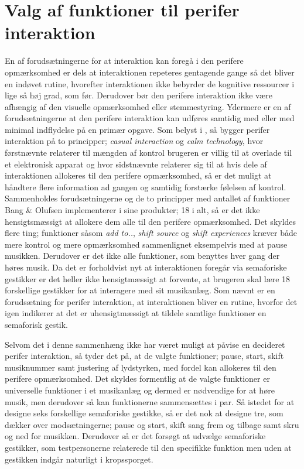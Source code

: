 \section{Valg af funktioner til perifer interaktion}
\label{DiskussionFunktionerCasualInteraction}
%
En af forudsætningerne for at interaktion kan foregå i den perifere opmærksomhed er dels at interaktionen repeteres gentagende gange så det bliver en indøvet rutine, hvorefter interaktionen ikke bebyrder de kognitive ressourcer i lige så høj grad, som før. Derudover bør den perifere interaktion ikke være afhængig af den visuelle opmærksomhed eller stemmestyring. Ydermere er en af forudsætningerne at den perifere interaktion kan udføres samtidig med eller med minimal indflydelse på en primær opgave. Som belyst i , så bygger perifer interaktion på to principper; \textit{casual interaction} og \textit{calm technology}, hvor førstnævnte relaterer til mængden af kontrol brugeren er villig til at overlade til et elektronisk apparat og hvor sidstnævnte relaterer sig til at hvis dele af interaktionen allokeres til den perifere opmærksomhed, så er det muligt at håndtere flere information ad gangen og samtidig forstærke følelsen af kontrol. Sammenholdes forudsætningerne og de to principper med antallet af funktioner Bang $\&$ Olufsen implementerer i sine produkter; 18 i alt, så er det ikke hensigtsmæssigt at allokere dem alle til den perifere opmærksomhed. Det skyldes flere ting; funktioner såsom \textit{add to..}, \textit{shift source} og \textit{shift experiences} kræver både mere kontrol og mere opmærksomhed sammenlignet eksempelvis med at pause musikken. Derudover er det ikke alle funktioner, som benyttes hver gang der høres musik. Da det er forholdvist nyt at interaktionen foregår via semaforiske gestikker er det heller ikke hensigtmæssigt at forvente, at brugeren skal lære 18 forskellige gestikker for at interagere med sit musikanlæg. Som nævnt er en forudsætning for perifer interaktion, at interaktionen bliver en rutine, hvorfor det igen indikerer at det er uhensigtmæssigt at tildele samtlige funktioner en semaforisk gestik. 

Selvom det i denne sammenhæng ikke har været muligt at påvise en decideret perifer interaktion, så tyder det på, at de valgte funktioner; pause, start, skift musiknummer samt justering af lydstyrken, med fordel kan allokeres til den perifere opmærksomhed. Det skyldes formentlig at de valgte funktioner er universelle funktioner i et musikanlæg og dermed er nødvendige for at høre musik, men derudover så kan funktionerne sammensættes i par. Så istedet for at designe seks forskellige semaforiske gestikke, så er det nok at designe tre, som dækker over modsætningerne; pause og start, skift sang frem og tilbage samt skru og ned for musikken. Derudover så er det forsøgt at udvælge semaforiske gestikker, som testpersonerne relaterede til den specifikke funktion men uden at gestikken indgår naturligt i kropssporget.  

